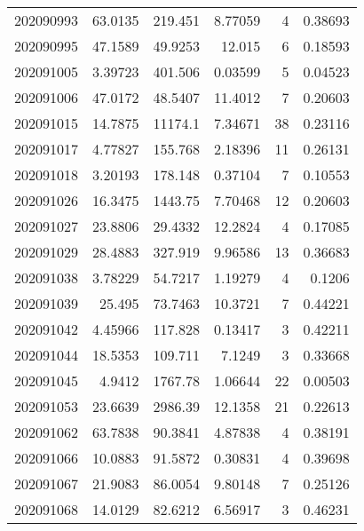 \begin{tabular}{rrrrrr}
 202090993 &         63.0135  &      219.451  &            8.77059 &           4 & 0.38693 \\
 202090995 &         47.1589  &       49.9253 &           12.015   &           6 & 0.18593 \\
 202091005 &          3.39723 &      401.506  &            0.03599 &           5 & 0.04523 \\
 202091006 &         47.0172  &       48.5407 &           11.4012  &           7 & 0.20603 \\
 202091015 &         14.7875  &    11174.1    &            7.34671 &          38 & 0.23116 \\
 202091017 &          4.77827 &      155.768  &            2.18396 &          11 & 0.26131 \\
 202091018 &          3.20193 &      178.148  &            0.37104 &           7 & 0.10553 \\
 202091026 &         16.3475  &     1443.75   &            7.70468 &          12 & 0.20603 \\
 202091027 &         23.8806  &       29.4332 &           12.2824  &           4 & 0.17085 \\
 202091029 &         28.4883  &      327.919  &            9.96586 &          13 & 0.36683 \\
 202091038 &          3.78229 &       54.7217 &            1.19279 &           4 & 0.1206  \\
 202091039 &         25.495   &       73.7463 &           10.3721  &           7 & 0.44221 \\
 202091042 &          4.45966 &      117.828  &            0.13417 &           3 & 0.42211 \\
 202091044 &         18.5353  &      109.711  &            7.1249  &           3 & 0.33668 \\
 202091045 &          4.9412  &     1767.78   &            1.06644 &          22 & 0.00503 \\
 202091053 &         23.6639  &     2986.39   &           12.1358  &          21 & 0.22613 \\
 202091062 &         63.7838  &       90.3841 &            4.87838 &           4 & 0.38191 \\
 202091066 &         10.0883  &       91.5872 &            0.30831 &           4 & 0.39698 \\
 202091067 &         21.9083  &       86.0054 &            9.80148 &           7 & 0.25126 \\
 202091068 &         14.0129  &       82.6212 &            6.56917 &           3 & 0.46231 \\

\end{tabular}
